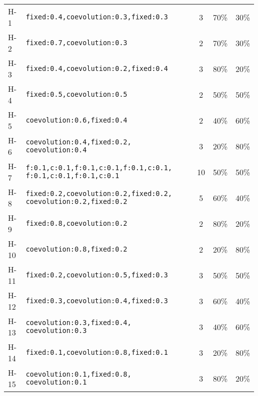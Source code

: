 \begin{longtable}{@{}l p{7cm} c c c@{}}
	H-1         & \texttt{fixed:0.4,coevolution:0.3,fixed:0.3}                            & 3             & 70\%             & 30\%              \\
	H-2         & \texttt{fixed:0.7,coevolution:0.3}                                      & 2             & 70\%             & 30\%              \\
	H-3         & \texttt{fixed:0.4,coevolution:0.2,fixed:0.4}                            & 3             & 80\%             & 20\%              \\
	H-4         & \texttt{fixed:0.5,coevolution:0.5}                                      & 2             & 50\%             & 50\%              \\
	H-5         & \texttt{coevolution:0.6,fixed:0.4}                                      & 2             & 40\%             & 60\%              \\
	H-6         & \texttt{coevolution:0.4,fixed:0.2, coevolution:0.4}                     & 3             & 20\%             & 80\%              \\
	H-7         & \texttt{f:0.1,c:0.1,f:0.1,c:0.1,f:0.1,c:0.1, f:0.1,c:0.1,f:0.1,c:0.1}   & 10            & 50\%             & 50\%              \\
	H-8         & \texttt{fixed:0.2,coevolution:0.2,fixed:0.2, coevolution:0.2,fixed:0.2} & 5             & 60\%             & 40\%              \\
	H-9         & \texttt{fixed:0.8,coevolution:0.2}                                      & 2             & 80\%             & 20\%              \\
	H-10        & \texttt{coevolution:0.8,fixed:0.2}                                      & 2             & 20\%             & 80\%              \\
	H-11        & \texttt{fixed:0.2,coevolution:0.5,fixed:0.3}                            & 3             & 50\%             & 50\%              \\
	H-12        & \texttt{fixed:0.3,coevolution:0.4,fixed:0.3}                            & 3             & 60\%             & 40\%              \\
	H-13        & \texttt{coevolution:0.3,fixed:0.4, coevolution:0.3}                     & 3             & 40\%             & 60\%              \\
	H-14        & \texttt{fixed:0.1,coevolution:0.8,fixed:0.1}                            & 3             & 20\%             & 80\%              \\
	H-15        & \texttt{coevolution:0.1,fixed:0.8, coevolution:0.1}                     & 3             & 80\%             & 20\%              \\

\end{longtable}
